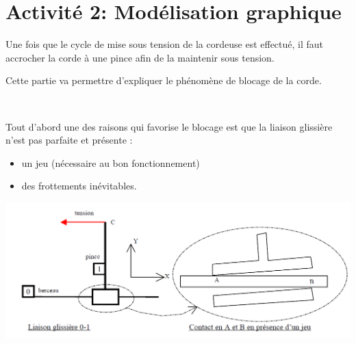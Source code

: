 \newpage

\section{Activité 2: Modélisation graphique}

Une fois que le cycle de mise sous tension de la cordeuse est effectué, il faut accrocher la corde à une pince afin de la maintenir sous tension.

Cette partie va permettre d'expliquer le phénomène de blocage de la corde.

~\

 \begin{minipage}{0.58\linewidth}
Tout d'abord une des raisons qui favorise le blocage est que la liaison glissière n'est pas parfaite et présente :
 \begin{itemize}
  \item un jeu (nécessaire au bon fonctionnement)
  \item des frottements inévitables.
 \end{itemize}
 \end{minipage}
 \hfill
  \begin{minipage}{0.4\linewidth}
   \centering\includegraphics[width=\linewidth]{img/cordeuse_arc.png}
  \end{minipage}

~\

